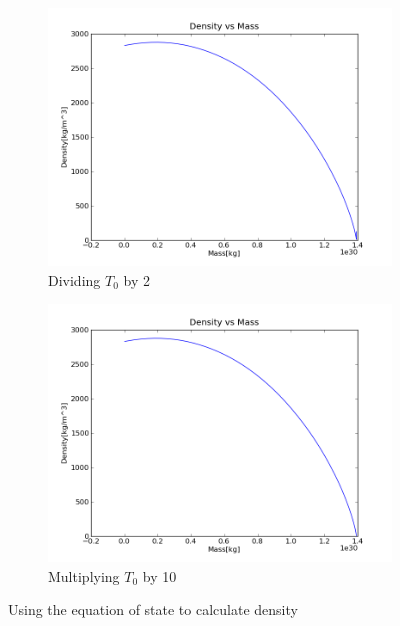 \documentclass[a4paper,12pt]{article}
\begin{document}
\begin{figure}[H]
    \centering
    \begin{subfigure}{0.49\textwidth}
      \includegraphics[width=\textwidth]{Calculate_density/Density_for_rho_p_t_others_constant_Tdiv2}
      \caption{Dividing $T_0$ by 2}
      \label{fig:density_density_Tdiv2}
    \end{subfigure}
    \begin{subfigure}{0.49\textwidth}
      \includegraphics[width=\textwidth]{Calculate_density/Density_for_rho_p_t_others_constant_Ttimes10}
      \caption{Multiplying $T_0$ by 10}
      \label{fig:density_density_Ttimes10}
    \end{subfigure}
    \caption{Using the equation of state to calculate density}
\end{figure}
\end{document}

